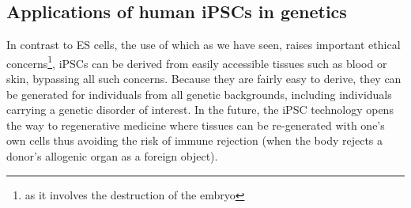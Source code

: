 




\subsection{Applications of human iPSCs in genetics}
\label{sec:ips_genetics}

In contrast to ES cells, the use of which as we have seen, raises important ethical concerns\footnote{as it involves the destruction of the embryo}, iPSCs
can be derived from easily accessible tissues such as blood or skin, bypassing all such concerns.
Because they are fairly easy to derive, they can be generated for individuals from all genetic backgrounds, including individuals carrying a genetic disorder of interest.
In the future, the iPSC technology opens the way to regenerative medicine where tissues can be re-generated with one's own cells thus avoiding the risk of immune rejection (when the body rejects a donor's allogenic organ as a foreign object).\\

